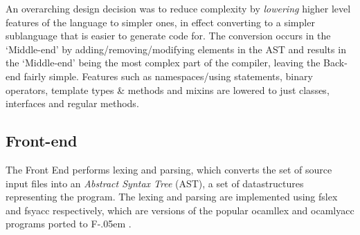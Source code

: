 \documentclass{article}
\newcommand{\sharponend}[1]{{\settoheight{\dimen0}{#1}#1\kern-.05em \resizebox{!}{\dimen0}{\raisebox{\depth}{\fontseries{b}\selectfont\#}}}}
\newcommand{\fsharp}{\sharponend{F}\xspace}
\begin{document}
An overarching design decision was to reduce complexity by \textit{lowering} higher level features of the language to simpler ones, in effect converting to a simpler sublanguage that is easier to generate code for.  The conversion occurs in the `Middle-end' by adding/removing/modifying elements in the AST and results in the `Middle-end' being the most complex part of the compiler, leaving the Back-end fairly simple. Features such as namespaces/using statements, binary operators, template types \& methods and mixins are lowered to just classes, interfaces and regular methods.

\subsection{Front-end}
The Front End performs lexing and parsing, which converts the set of source input files into an \textit{Abstract Syntax Tree} (AST), a set of datastructures representing the program. The lexing and parsing are implemented using fslex and fsyacc respectively, which are versions of the popular ocamllex and ocamlyacc programs ported to \fsharp\cite{fsPowerPack}. 
\end{document}
